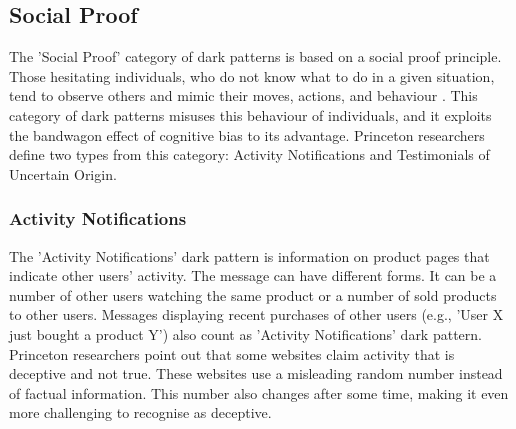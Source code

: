             \subsection{Social Proof}
            The 'Social Proof' category of dark patterns is based on a social proof principle. Those hesitating individuals, who do not know what to do in a given situation, tend to observe others and mimic their moves, actions, and behaviour \cite{influence-cialdini, evilbydesign}. This category of dark patterns misuses this behaviour of individuals, and it exploits the bandwagon effect of cognitive bias to its advantage. Princeton researchers define two types from this category: Activity Notifications and Testimonials of Uncertain Origin.
        
                \subsubsection{Activity Notifications}
                The 'Activity Notifications' dark pattern is information on product pages that indicate other users' activity. The message can have different forms. It can be a number of other users watching the same product or a number of sold products to other users. Messages displaying recent purchases of other users (e.g., 'User X just bought a product Y') also count as 'Activity Notifications' dark pattern. Princeton researchers point out that some websites claim activity that is deceptive and not true. These websites use a misleading random number instead of factual information. This number also changes after some time, making it even more challenging to recognise as deceptive. 
        
